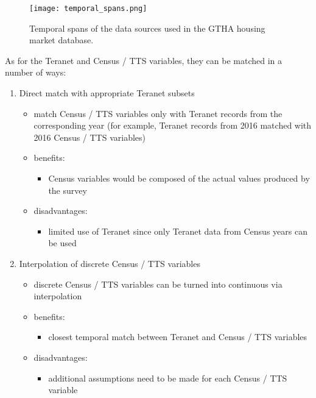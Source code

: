 \begin{figure}[hbt!]
    \centering
    \texttt{[image: temporal\_spans.png]}
    \caption{Temporal spans of the data sources used in the GTHA housing market database.}
    \label{fig:temporal_spans}
\end{figure}

\vspace{5mm}

As for the Teranet and Census / TTS variables, they can be matched in a number of ways:

\begin{enumerate}
    \item Direct match with appropriate Teranet subsets
    \begin{itemize}
        \item match Census / TTS variables only with Teranet records from the corresponding year (for example, Teranet records from 2016 matched with 2016 Census / TTS variables)
        \item benefits:
        \begin{itemize}
            \item Census variables would be composed of the actual values produced by the survey
        \end{itemize}
        \item disadvantages:
        \begin{itemize}
            \item limited use of Teranet since only Teranet data from Census years can be used
        \end{itemize}
    \end{itemize}
    \item Interpolation of discrete Census / TTS variables
    \begin{itemize}
        \item discrete Census / TTS variables can be turned into continuous via interpolation
        \item benefits:
        \begin{itemize}
            \item closest temporal match between Teranet and Census / TTS variables
        \end{itemize}
        \item disadvantages:
        \begin{itemize}
            \item additional assumptions need to be made for each Census / TTS variable

\end{itemize}
\end{itemize}
\end{enumerate}
